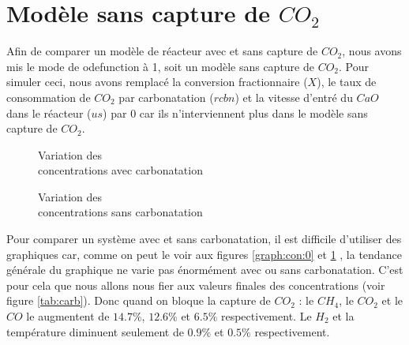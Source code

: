 \documentclass[11pt]{report}
\begin{document}
        \section{Modèle sans capture de $CO_2$}
            Afin de comparer un modèle de réacteur avec et sans capture de $CO_2$,
            nous avons mis le mode de odefunction à 1, soit un modèle sans capture de $CO_2$.
            Pour simuler ceci, nous avons remplacé la conversion fractionnaire ($X$),
            le taux de consommation de $CO_2$ par carbonatation ($rcbn$)
            et la vitesse d'entré du $CaO$ dans le réacteur ($us$)
            par $0$ car ils n'interviennent plus dans le modèle sans capture de $CO_2$.
            \par
            \begin{figure}[h]
                \centering
                \begin{minipage}{0.45\textwidth}
                    \centering
                    
                    \caption{Variation des\\ concentrations avec carbonatation}
                    \label{graph:con:0}
                \end{minipage}
                \begin{minipage}{0.45\textwidth}
                    \centering
                    
                    \caption{Variation des\\ concentrations sans carbonatation}
                    \label{graph:con:1}
                \end{minipage}
            \end{figure}
            \par
            Pour comparer un système avec et sans carbonatation,
            il est difficile d'utiliser des graphiques car,
            comme on peut le voir aux figures \ref{graph:con:0} et \ref{graph:con:1} ,
            la tendance générale du graphique ne varie pas énormément avec ou sans carbonatation.
            C'est pour cela que nous allons nous fier aux valeurs finales des concentrations (voir figure \ref{tab:carb}).
            Donc quand on bloque la capture de $CO_2$ : le $CH_4$, le $CO_2$
            et le $CO$  le  augmentent de $14.7\%$, $12.6\%$ et $6.5\%$ respectivement.
            Le $H_2$ et la température diminuent seulement de $0.9\%$ et $0.5\%$ respectivement.
            \par
\end{document}
